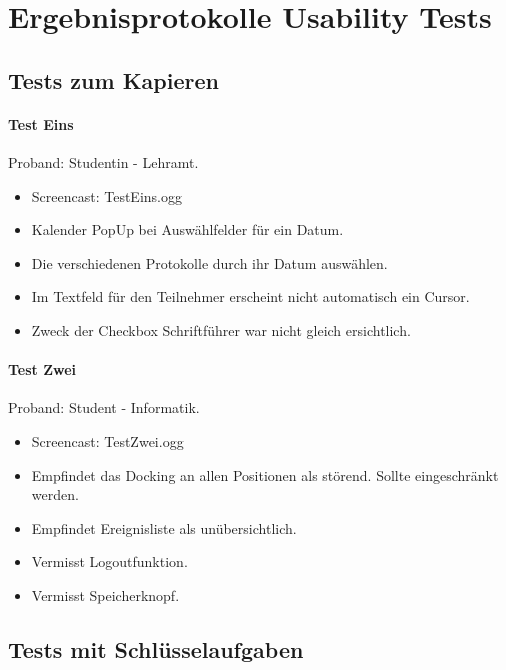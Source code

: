 \section{Ergebnisprotokolle Usability Tests}
\subsection{Tests zum Kapieren}
\paragraph*{Test Eins}
Proband: Studentin - Lehramt.
\begin{itemize}
	\item Screencast: Test\textunderscore Eins.ogg 
	\item Kalender PopUp bei Auswählfelder für ein Datum.
	\item Die verschiedenen Protokolle durch ihr Datum auswählen.
	\item Im Textfeld für den Teilnehmer erscheint nicht automatisch ein Cursor.
	\item Zweck der Checkbox Schriftführer war nicht gleich ersichtlich.

\end{itemize}

\paragraph*{Test Zwei}
Proband: Student - Informatik. 
\begin{itemize}
	\item Screencast: Test\textunderscore Zwei.ogg 
	\item Empfindet das Docking an allen Positionen als störend. Sollte eingeschränkt werden.
	\item Empfindet Ereignisliste als unübersichtlich.
	\item Vermisst Logoutfunktion.
	\item Vermisst Speicherknopf.
\end{itemize}

\subsection{Tests mit Schlüsselaufgaben}
